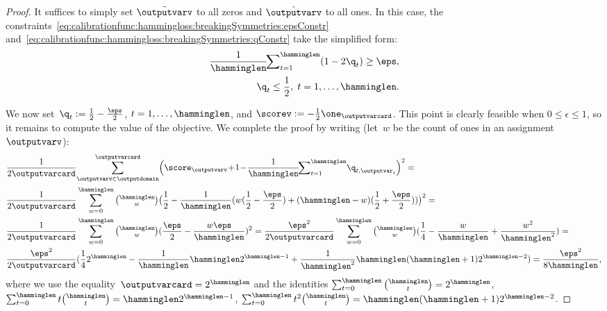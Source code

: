 \documentclass{article}
\begin{document}
\begin{proof}
    It suffices to simply set $\tilde{\outputvarv}$ to all zeros and $\hat{\outputvarv}$ to all ones.
    In this case, the constraints~\eqref{eq:calibrationfunc:hammingloss:breakingSymmetries:epsConstr} and~\eqref{eq:calibrationfunc:hammingloss:breakingSymmetries:qConstr} take the simplified form:
    \begin{align}
    \label{eq:calibrationfunc:hammingloss:breakingSymmetries:epsConstr:2}
    \frac{1}{\hamminglen}\!\!\sum\nolimits_{t=1}^{\hamminglen} (1 - 2\q_t) \geq \eps,\\
    \label{eq:calibrationfunc:hammingloss:breakingSymmetries:qConstr:2}
    \q_t \leq \frac12, \; t = 1,\dots, \hamminglen.
    \end{align}
    
    We now set~$\q_t := \frac12 - \frac{\eps}{2}$, $t = 1, \dots, \hamminglen$, and $\scorev := -\frac12\one_{\outputvarcard}$.
    This point is clearly feasible when $0\leq\epsilon\leq 1$, so it remains to compute the value of the objective.
    We complete the proof by writing (let~$w$ be the count of ones in an assignment $\outputvarv$):
    \begin{align*}
    &\frac{1}{2 \outputvarcard}\! \sum_{\outputvarv \in \outputdomain}^{\outputvarcard} \Bigl( \score_\outputvarv \!+\! 1 \!-\! \frac{1}{\hamminglen} \!\!\sum\nolimits_{t=1}^\hamminglen \!\q_{t, \outputvar_t}\Bigr)^2
    =\\
    &\frac{1}{2 \outputvarcard} \sum_{w=0}^{\hamminglen} \tbinom{\hamminglen}{w} \bigl(\frac12 - \frac{1}{\hamminglen} (w(\frac12 - \frac{\eps}{2}) + (\hamminglen - w)(\frac12 + \frac{\eps}{2})) \bigr)^2 =
    \\
    & \frac{1}{2 \outputvarcard} \sum_{w=0}^{\hamminglen} \tbinom{\hamminglen}{w} (\frac{\eps}{2} - \frac{w\eps}{\hamminglen})^2 = \frac{\eps^2}{2 \outputvarcard} \sum_{w=0}^{\hamminglen} \tbinom{\hamminglen}{w} (\frac14 - \frac{w}{\hamminglen} + \frac{w^2}{\hamminglen^2}) =\\
    &\frac{\eps^2}{2 \outputvarcard} (\frac14 2^\hamminglen - \frac{1}{\hamminglen} \hamminglen 2^{\hamminglen-1} + \frac{1}{\hamminglen^2}\hamminglen(\hamminglen+1)2^{\hamminglen-2}) = \frac{\eps^2}{8\hamminglen},
    \end{align*}
    where we use the equality~$\outputvarcard = 2^\hamminglen$ and the identities $\sum_{t=0}^\hamminglen \binom{\hamminglen}{t} = 2^\hamminglen$, $\sum_{t=0}^\hamminglen t \binom{\hamminglen}{t} = \hamminglen 2^{\hamminglen-1}$, $\sum_{t=0}^\hamminglen t^2 \binom{\hamminglen}{t} = \hamminglen (\hamminglen+1) 2^{\hamminglen-2}$.
\end{proof}
\end{document}
